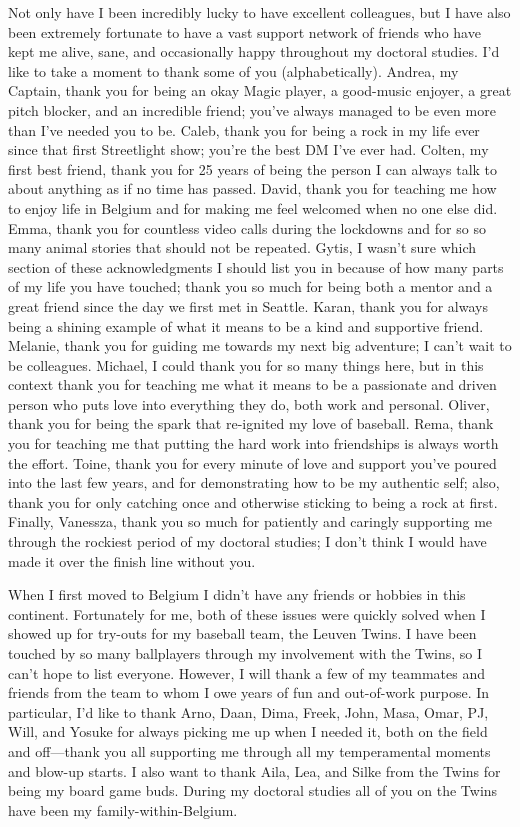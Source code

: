 Not only have I been incredibly lucky to have excellent colleagues, but I have also been extremely fortunate to have a vast support network of friends who have kept me alive, sane, and occasionally happy throughout my doctoral studies.
I'd like to take a moment to thank some of you (alphabetically).
Andrea, my Captain, thank you for being an okay Magic player, a good-music enjoyer, a great pitch blocker, and an incredible friend; you've always managed to be even more than I've needed you to be.
Caleb, thank you for being a rock in my life ever since that first Streetlight show; you're the best DM I've ever had.
Colten, my first best friend, thank you for 25 years of being the person I can always talk to about anything as if no time has passed.
David, thank you for teaching me how to enjoy life in Belgium and for making me feel welcomed when no one else did.
Emma, thank you for countless video calls during the lockdowns and for so so many animal stories that should not be repeated.
Gytis, I wasn't sure which section of these acknowledgments I should list you in because of how many parts of my life you have touched; thank you so much for being both a mentor and a great friend since the day we first met in Seattle.
Karan, thank you for always being a shining example of what it means to be a kind and supportive friend.
Melanie, thank you for guiding me towards my next big adventure; I can't wait to be colleagues.
Michael, I could thank you for so many things here, but in this context thank you for teaching me what it means to be a passionate and driven person who puts love into everything they do, both work and personal.
Oliver, thank you for being the spark that re-ignited my love of baseball.
Rema, thank you for teaching me that putting the hard work into friendships is always worth the effort.
Toine, thank you for every minute of love and support you've poured into the last few years, and for demonstrating how to be my authentic self; also, thank you for only catching once and otherwise sticking to being a rock at first.
Finally, Vanessza, thank you so much for patiently and caringly supporting me through the rockiest period of my doctoral studies; I don't think I would have made it over the finish line without you.

When I first moved to Belgium I didn't have any friends or hobbies in this continent.
Fortunately for me, both of these issues were quickly solved when I showed up for try-outs for my baseball team, the Leuven Twins.
I have been touched by so many ballplayers through my involvement with the Twins, so I can't hope to list everyone.
However, I will thank a few of my teammates and friends from the team to whom I owe years of fun and out-of-work purpose.
In particular, I'd like to thank Arno, Daan, Dima, Freek, John, Masa, Omar, PJ, Will, and Yosuke for always picking me up when I needed it, both on the field and off---thank you all supporting me through all my temperamental moments and blow-up starts.
I also want to thank Aila, Lea, and Silke from the Twins for being my board game buds.
During my doctoral studies all of you on the Twins have been my family-within-Belgium.

